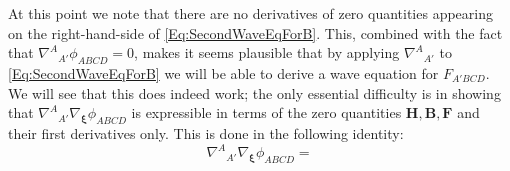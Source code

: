 \documentclass[10pt,a4paper]{article}
\theoremstyle{plain}
\def\bmB{{\bm B}}
\def\bmF{{\bm F}}
\def\bmH{{\bm H}}
\def\bmB{{\bm B}}
\def\bmF{{\bm F}}
\def\bmH{{\bm H}}
\begin{document}
At this point we note that there are no derivatives of zero quantities appearing on the right-hand-side of \eqref{Eq:SecondWaveEqForB}. This, combined with the fact that $\nabla^A{}_{A'}\phi_{ABCD}=0$, makes it seems plausible that by applying $\nabla^A{}_{A'}$ to \eqref{Eq:SecondWaveEqForB} we will be able to derive a wave equation for $F_{A'BCD}$. We will see that this does indeed work; the only essential difficulty is in showing that $\nabla^A{}_{A'}\nabla_{\bm\xi}\phi_{ABCD}$ is expressible in terms of the zero quantities $\bmH, \bmB, \bmF$ and their first derivatives only. This is done in the following identity: 
\begin{equation}
    \nabla^A{}_{A'}\nabla_{\bm\xi}\phi_{ABCD} = 
\end{equation}
\end{document}
